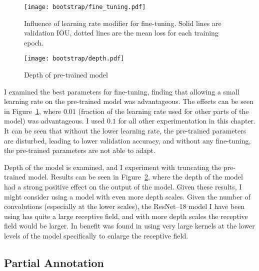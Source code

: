 \begin{figure}[!ht]
\centering
  \centering
  \texttt{[image: bootstrap/fine\_tuning.pdf]}
  \caption{Influence of learning rate modifier for fine-tuning. Solid lines are validation IOU, dotted lines are the mean loss for each training epoch. }  
  \label{fig:bootstrap_fine}
\end{figure}


\begin{figure}[!ht]
  \centering
  \texttt{[image: bootstrap/depth.pdf]}
  \caption{Depth of pre-trained model}  
  \label{fig:bootstrap_depth}
\end{figure}


I examined the best parameters for fine-tuning, finding that allowing a small learning rate on the pre-trained model was advantageous. The effects can be seen in Figure~\ref{fig:bootstrap_fine}, where $0.01$ (fraction of the learning rate used for other parts of the model) was advantageous. I used $ 0.1 $ for all other experimentation in this chapter. It can be seen that without the lower learning rate, the pre-trained parameters are disturbed, leading to lower validation accuracy, and without any fine-tuning, the pre-trained parameters are not able to adapt.

Depth of the model is examined, and I experiment with truncating the pre-trained model. Results can be seen in Figure~\ref{fig:bootstrap_depth}, where the depth of the model had a strong positive effect on the output of the model. Given these results, I might consider using a model with even more depth scales. Given the number of convolutions (especially at the lower scales), the ResNet--18 model I have been using has quite a large receptive field, and with more depth scales the receptive field would be larger. In \cite{Peng2017} benefit was found in using very large kernels at the lower levels of the model specifically to enlarge the receptive field.






\subsection {Partial Annotation}


